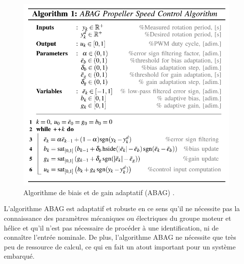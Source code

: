 {\begin{figure}[ht!]
    \centerline{
    \includegraphics[trim=0cm 0cm 0cm 0cm,clip,width=0.6\columnwidth]{figures/ABAG_algo.png}}
    \caption{Algorithme de biais et de gain adaptatif (ABAG) \cite{franchi2017}.}
    \label{fig:ABAG_algo}
\end{figure}
L'algorithme ABAG est adaptatif et robuste en ce sens qu'il ne nécessite pas la connaissance des paramètres mécaniques ou électriques du groupe moteur et hélice et qu'il n'est pas nécessaire de procéder à une identification, ni de connaître l'entrée nominale. De plus, l'algorithme ABAG ne nécessite que très peu de ressource de calcul, ce qui en fait un atout important pour un système embarqué.

 }